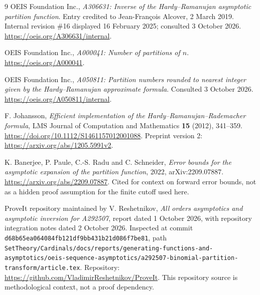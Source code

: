 \documentclass[11pt]{article}
\numberwithin{equation}{section}
\theoremstyle{definition}
\theoremstyle{remark}
\begin{document}
\begin{thebibliography}{9}
OEIS Foundation Inc., \emph{A306631: Inverse of the Hardy--Ramanujan
asymptotic partition function}. Entry credited to Jean-Fran\c{c}ois
Alcover, 2 March 2019. Internal revision \#16 displayed 16 February 2025;
consulted 3 October 2026.
\url{https://oeis.org/A306631/internal}.

OEIS Foundation Inc., \emph{A000041: Number of partitions of $n$}.
\url{https://oeis.org/A000041}.

OEIS Foundation Inc., \emph{A050811: Partition numbers rounded to nearest
integer given by the Hardy--Ramanujan approximate formula}.
Consulted 3 October 2026.
\url{https://oeis.org/A050811/internal}.

F. Johansson, \emph{Efficient implementation of the
Hardy--Ramanujan--Rademacher formula}, LMS Journal of Computation and
Mathematics \textbf{15} (2012), 341--359.
\url{https://doi.org/10.1112/S1461157012001088}.
Preprint version 2:
\url{https://arxiv.org/abs/1205.5991v2}.

K. Banerjee, P. Paule, C.-S. Radu and C. Schneider,
\emph{Error bounds for the asymptotic expansion of the partition
function}, 2022, arXiv:2209.07887.
\url{https://arxiv.org/abs/2209.07887}.
Cited for context on forward error bounds, not as a hidden proof
assumption for the finite cutoff used here.

ProveIt repository maintained by V. Reshetnikov, \emph{All orders asymptotics and
asymptotic inversion for A292507}, report dated 1 October 2026, with
repository integration notes dated 2 October 2026. Inspected at commit
\texttt{d68b65ea064084fb121df9bb431b21d086f7be81}, path
\nolinkurl{SetTheory/Cardinals/docs/reports/generating-functions-and-asymptotics/oeis-sequence-asymptotics/a292507-binomial-partition-transform/article.tex}.
Repository: \url{https://github.com/VladimirReshetnikov/ProveIt}.
This repository source is methodological context, not a proof dependency.
\end{thebibliography}
\end{document}
